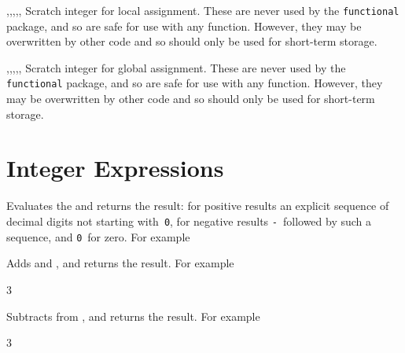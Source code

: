 \documentclass[oneside]{book}
\begin{document}
\begin{variable}{\lTmpaInt,\lTmpbInt,\lTmpcInt,\lTmpiInt,\lTmpjInt,\lTmpkInt}
Scratch integer for local assignment. These are never used by
the \verb!functional! package, and so are safe for use with any
function. However, they may be overwritten by other
code and so should only be used for short-term storage.
\end{variable}

\begin{variable}{\gTmpaInt,\gTmpbInt,\gTmpcInt,\gTmpiInt,\gTmpjInt,\gTmpkInt}
Scratch integer for global assignment. These are never used by
the \verb!functional! package, and so are safe for use with any
function. However, they may be overwritten by other
code and so should only be used for short-term storage.
\end{variable}

\section{Integer Expressions}

\begin{function}{\IntEval}
\begin{syntax}
 
\end{syntax}
Evaluates the  and returns the result:
for positive results an
explicit sequence of decimal digits not starting with~\texttt{0},
for negative results \texttt{-}~followed by such a sequence, and
\texttt{0}~for zero. For example
\begin{demohigh}
\end{demohigh}
\end{function}

\begin{function}{\IntMathAdd}
\begin{syntax}
  
\end{syntax}
Adds  and ,
and returns the result. For example
\begin{demohigh}
 {3}
\end{demohigh}
\end{function}

\begin{function}{\IntMathSub}
\begin{syntax}
  
\end{syntax}
Subtracts  from ,
and returns the result. For example
\begin{demohigh}
 {3}
\end{demohigh}
\end{function}
\end{document}
